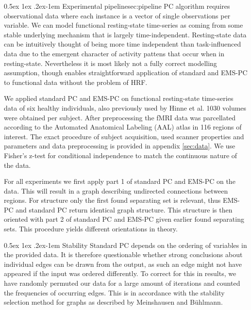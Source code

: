 \documentclass[a4paper, 10pt, english, onecolumn]{article}
\makeatletter
\renewcommand{\paragraph}{%
  \@startsection{paragraph}{4}%
  {\z@}{0.5ex \@plus 1ex \@minus .2ex}{-1em}%
  {\normalfont\normalsize\bfseries}%
}
\makeatother
\begin{document}
\paragraph{Experimental pipeline}{sec:pipeline}
PC algorithm requires observational data where each instance is a vector of single observations per variable.
We can model functional resting-state time-series as coming from some stable underlying mechanism that is largely time-independent.
Resting-state data can be intuitively thought of being more time independent than task-influenced data due to the emergent character of activity pattens that occur when in resting-state.
Nevertheless it is most likely not a fully correct modelling assumption, though enables straightforward application of standard and EMS-PC to functional data without the problem of HRF.

We applied standard PC and EMS-PC on functional resting-state time-series data of six healthy individuals, also previously used by Hinne et al\cite{hinne2013}.
1030 volumes were obtained per subject.
After preprocessing the fMRI data was parcellated according to the Automated Anatomical Labeling (AAL) atlas in 116 regions of interest.
The exact procedure of subject acquisition, used scanner properties and parameters and data preprocessing is provided in appendix \ref{sec:data}.
We use Fisher's z-test for conditional independence to match the continuous nature of the data.

For all experiments we first apply part 1 of standard PC and EMS-PC on the data.
This will result in a graph describing undirected connections between regions.
For structure only the first found separating set is relevant, thus EMS-PC and standard PC return identical graph structure.
This structure is then oriented with part 2 of standard PC and EMS-PC given earlier found separating sets.
This procedure yields different orientations in theory.

\paragraph{Stability}
Standard PC depends on the ordering of variables in the provided data\cite[p.120-122]{spirtes2000}.
It is therefore questionable whether strong conclusions about individual edges can be drawn from the output, as such an edge might not have appeared if the input was ordered differently.
To correct for this in results, we have randomly permuted our data for a large amount of iterations and counted the frequencies of occurring edges.
This is in accordance with the stability selection method for graphs as described by Meinshausen and B{\"u}hlmann\cite{meinshausen2010}.
\end{document}
